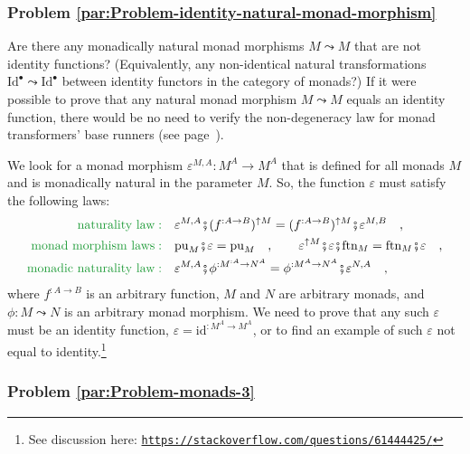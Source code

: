 \subsubsection{Problem \label{par:Problem-identity-natural-monad-morphism}\ref{par:Problem-identity-natural-monad-morphism}}

Are there any monadically natural monad morphisms $M\leadsto M$ that
are not identity functions? (Equivalently, any non-identical natural
transformations $\text{Id}^{\bullet}\leadsto\text{Id}^{\bullet}$
between identity functors in the category of monads?) If it were possible
to prove that any natural monad morphism $M\leadsto M$ equals an
identity function, there would be no need to verify the non-degeneracy
law for monad transformers\textsf{'} base runners (see page~\pageref{par:Open-question-monad-id-trans}).

We look for a monad morphism $\varepsilon^{M,A}:M^{A}\rightarrow M^{A}$
that is defined for all monads $M$ and is monadically natural in
the parameter $M$. So, the function $\varepsilon$ must satisfy the
following laws:
\begin{align*}
{\color{greenunder}\text{naturality law}:}\quad & \varepsilon^{M,A}\bef(f^{:A\rightarrow B})^{\uparrow M}=(f^{:A\rightarrow B})^{\uparrow M}\bef\varepsilon^{M,B}\quad,\\
{\color{greenunder}\text{monad morphism laws}:}\quad & \text{pu}_{M}\bef\varepsilon=\text{pu}_{M}\quad,\quad\quad\varepsilon^{\uparrow M}\bef\varepsilon\bef\text{ftn}_{M}=\text{ftn}_{M}\bef\varepsilon\quad,\\
{\color{greenunder}\text{monadic naturality law}:}\quad & \varepsilon^{M,A}\bef\phi^{:M^{:A}\rightarrow N^{A}}=\phi^{:M^{A}\rightarrow N^{A}}\bef\varepsilon^{N,A}\quad,
\end{align*}
where $f^{:A\rightarrow B}$ is an arbitrary function, $M$ and $N$
are arbitrary monads, and $\phi:M\leadsto N$ is an arbitrary monad
morphism. We need to prove that any such $\varepsilon$ must be an
identity function, $\varepsilon=\text{id}^{:M^{A}\rightarrow M^{A}}$,
or to find an example of such $\varepsilon$ not equal to identity.\footnote{See discussion here: \texttt{\href{https://stackoverflow.com/questions/61444425/}{https://stackoverflow.com/questions/61444425/}}}

\subsubsection{Problem \label{par:Problem-monads-3}\ref{par:Problem-monads-3}}

